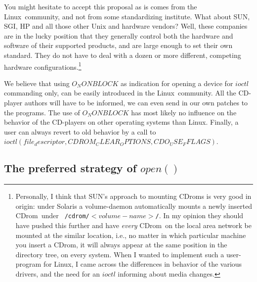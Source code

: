 \documentclass{article}
\def\linux{{\sc Linux}}
\def\cdrom{{\sc CDrom}}
\begin{document}
You might hesitate to accept this proposal as is comes from the
\linux\ community, and not from some standardizing institute. What
about SUN, SGI, HP and all those other Unix and hardware vendors?
Well, these companies are in the lucky position that they generally
control both the hardware and software of their supported products,
and are large enough to set their own standard. They do not have to
deal with a dozen or more different, competing hardware
configurations.\footnote{Personally, I think that SUN's approach to
mounting \cdrom s is very good in origin: under Solaris a
volume-daemon automatically mounts a newly inserted \cdrom\ under {\tt
/cdrom/$<volume-name>$/}. In my opinion they should have pushed this
further and have {\em every\/} \cdrom\ on the local area network be
mounted at the similar location, i.e., no matter in which particular
machine you insert a \cdrom, it will always appear at the same
position in the directory tree, on every system. When I wanted to
implement such a user-program for \linux, I came across the
differences in behavior of the various drivers, and the need for an
$ioctl$ informing about media changes.}

We believe that using $O_NONBLOCK$ as indication for opening a device
for $ioctl$ commanding only, can be easily introduced in the \linux\
community. All the CD-player authors will have to be informed, we can
even send in our own patches to the programs. The use of $O_NONBLOCK$
has most likely no influence on the behavior of the CD-players on
other operating systems than \linux. Finally, a user can always revert
to old behavior by a call to $ioctl(file_descriptor, CDROM_CLEAR_OPTIONS,
CDO_USE_FFLAGS)$. 

\subsection{The preferred strategy of $open()$}
\end{document}
